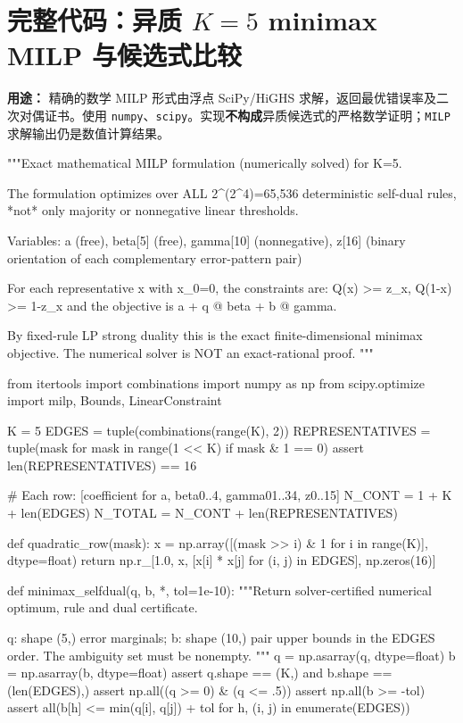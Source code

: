 \documentclass[11pt,a4paper]{ctexart}
\theoremstyle{definition}
\begin{document}
\section{完整代码：异质 $K=5$ minimax MILP 与候选式比较}
\noindent\textbf{用途：} 精确的数学 MILP 形式由浮点 SciPy/HiGHS 求解，返回最优错误率及二次对偶证书。使用 \texttt{numpy}、\texttt{scipy}。实现\textbf{不构成}异质候选式的严格数学证明；\texttt{MILP} 求解输出仍是数值计算结果。

\begin{CodeListing}
"""Exact mathematical MILP formulation (numerically solved) for K=5.

The formulation optimizes over ALL 2^(2^4)=65,536 deterministic
self-dual rules, *not* only majority or nonnegative linear thresholds.

Variables:
    a (free), beta[5] (free), gamma[10] (nonnegative),
    z[16] (binary orientation of each complementary error-pattern pair)

For each representative x with x_0=0, the constraints are:
    Q(x) >= z_x, Q(1-x) >= 1-z_x
and the objective is a + q @ beta + b @ gamma.

By fixed-rule LP strong duality this is the exact finite-dimensional
minimax objective. The numerical solver is NOT an exact-rational proof.
"""

from itertools import combinations
import numpy as np
from scipy.optimize import milp, Bounds, LinearConstraint

K = 5
EDGES = tuple(combinations(range(K), 2))
REPRESENTATIVES = tuple(mask for mask in range(1 << K) if mask & 1 == 0)
assert len(REPRESENTATIVES) == 16

# Each row: [coefficient for a, beta0..4, gamma01..34, z0..15]
N_CONT = 1 + K + len(EDGES)
N_TOTAL = N_CONT + len(REPRESENTATIVES)


def quadratic_row(mask):
    x = np.array([(mask >> i) & 1 for i in range(K)], dtype=float)
    return np.r_[1.0, x, [x[i] * x[j] for (i, j) in EDGES], np.zeros(16)]


def minimax_selfdual(q, b, *, tol=1e-10):
    """Return solver-certified numerical optimum, rule and dual certificate.

    q: shape (5,) error marginals; b: shape (10,) pair upper bounds
    in the EDGES order. The ambiguity set must be nonempty.
    """
    q = np.asarray(q, dtype=float)
    b = np.asarray(b, dtype=float)
    assert q.shape == (K,) and b.shape == (len(EDGES),)
    assert np.all((q >= 0) & (q <= .5))
    assert np.all(b >= -tol)
    assert all(b[h] <= min(q[i], q[j]) + tol
               for h, (i, j) in enumerate(EDGES))


\end{CodeListing}
\end{document}
